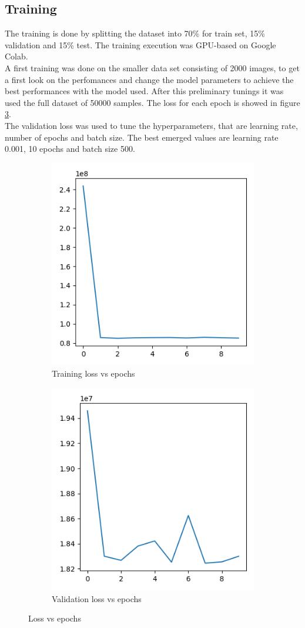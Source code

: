 \subsection{Training}
The training is done by splitting the dataset into 70\% for train set, 15\% validation and 15\% test. The training execution was GPU-based on Google Colab.\\
A first training was done on the smaller data set consisting of 2000 images, to get a first look on the perfomances and change the model parameters to achieve the best performances with the model used. After this preliminary tunings it was used the full dataset of 50000 samples. The loss for each epoch is showed in figure \ref{fig:ValLoss}.\\
The validation loss was used to tune the hyperparameters, that are learning rate, number of epochs and batch size. The best emerged values are learning rate 0.001, 10 epochs and batch size 500.
\begin{figure}[h!]
	\centering
	\begin{subfigure}{.5\textwidth}
		\centering
		\includegraphics[width=0.4\linewidth]{./ImageFiles/Training/train-cost}
		\caption{Training loss vs epochs}
		\label{fig:TrainLoss}
	\end{subfigure}%
	\begin{subfigure}{.5\textwidth}
		\centering
		\includegraphics[width=0.4\linewidth]{./ImageFiles/Training/val-cost}
		\caption{Validation loss vs epochs}
		\label{fig:ValLoss}
	\end{subfigure}
	\caption{Loss vs epochs}
	\label{fig:ValLoss}
\end{figure}